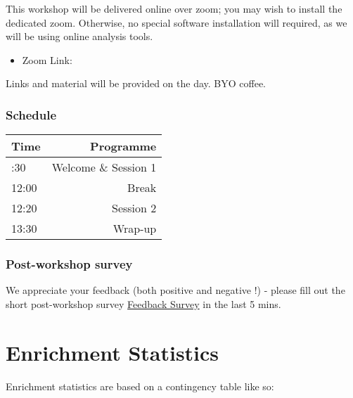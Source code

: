 \documentclass[
]{book}
\providecommand{\tightlist}{%
  \setlength{\itemsep}{0pt}\setlength{\parskip}{0pt}}
\begin{document}
This workshop will be delivered online over zoom; you may wish to install the dedicated zoom. Otherwise, no special software installation will required, as we will be using online analysis tools.

\begin{itemize}
\tightlist
\item
  Zoom Link:
\end{itemize}

Links and material will be provided on the day. BYO coffee.

\subsection{Schedule}\label{schedule}

\begin{longtable}[]{@{}lr@{}}
\toprule\noalign{}
Time & Programme \\
\midrule\noalign{}
\endhead
\bottomrule\noalign{}
\endlastfoot
10:30 & Welcome \& Session 1 \\
12:00 & Break \\
12:20 & Session 2 \\
13:30 & Wrap-up \\
\end{longtable}

\subsection{Post-workshop survey}\label{post-workshop-survey}

We appreciate your feedback (both positive and negative !) - please fill out the short post-workshop survey \href{https://docs.google.com/forms/d/e/1FAIpQLSdmWreDIWjVsIR5g22jvcypH8ChFyMJ506HTAIoMIJYzjD-3Q/viewform}{Feedback Survey} in the last 5 mins.

\chapter{Enrichment Statistics}\label{enrichment-statistics}

Enrichment statistics are based on a contingency table like so:
\end{document}
